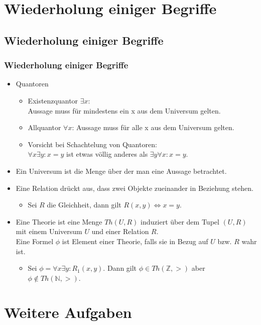 \section{Wiederholung einiger Begriffe}
\subsection{Wiederholung einiger Begriffe}
\begin{frame}
	\frametitle{Wiederholung einiger Begriffe}
	\begin{itemize}
		\item Quantoren
		\begin{itemize}
			\item Existenzquantor $\exists x$: \\ Aussage muss für mindestens ein x aus dem Universum gelten.
			\item Allquantor $\forall x$: Aussage muss für alle x aus dem Universum gelten.
			\item Vorsicht bei Schachtelung von Quantoren: \\ $\forall x \exists y: x = y$ ist etwas völlig anderes als $\exists y \forall x: x = y$.
		\end{itemize}
		\item Ein Universum ist die Menge über der man eine Aussage betrachtet.
		\item Eine Relation drückt aus, dass zwei Objekte zueinander in Beziehung stehen.
		\begin{itemize}
			\item Sei $R$ die Gleichheit, dann gilt $R(x, y) \Leftrightarrow x = y$.
		\end{itemize}
		\item Eine Theorie ist eine Menge $Th(U, R)$ induziert über dem Tupel $(U, R)$ mit einem Universum $U$ und einer Relation $R$. \\ 
		Eine Formel $\phi$ ist Element einer Theorie, falls sie in Bezug auf $U$ bzw. $R$ wahr ist.
		\begin{itemize}
			\item Sei $\phi = \forall x \exists y: R_1(x,y)$. Dann gilt $\phi \in Th(\mathbb{Z}, >)$ aber $\phi \notin Th(\mathbb{N}, >)$.
		\end{itemize}
	\end{itemize}
\end{frame}

\section{Weitere Aufgaben}
